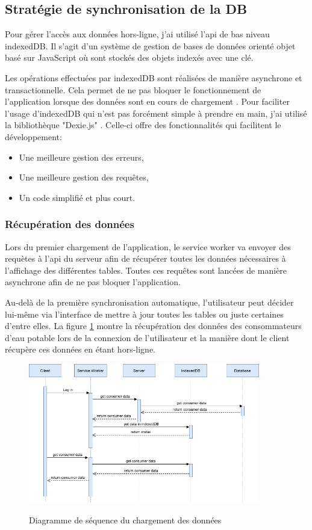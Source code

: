 \documentclass{EPL-master-thesis-covers-FR}
\begin{document}
					
			\subsection*{Stratégie de synchronisation de la DB}
				Pour gérer l'accès aux données hors-ligne, j'ai utilisé l'\gls{api} de bas niveau indexedDB. Il s'agit d'un système de gestion de bases de données orienté objet basé sur JavaScript où sont stockés des objets indexés avec une clé. 
				
				Les opérations effectuées par indexedDB sont réalisées de manière asynchrone et transactionnelle. Cela permet de ne pas bloquer le fonctionnement de l'application lorsque des données sont en cours de chargement \cite{ref:indexedDB}. Pour faciliter l'usage d'indexedDB qui n'est pas forcément simple à prendre en main, j'ai utilisé la bibliothèque "Dexie.js" \cite{ref:dexie}. Celle-ci offre des fonctionnalités qui facilitent le développement: 
				\begin{itemize}
					\item Une meilleure gestion des erreurs,
					\item Une meilleure gestion des requêtes,
					\item Un code simplifié et plus court.
				\end{itemize}					
				
				
				\subsubsection*{Récupération des données}
					Lors du premier chargement de l'application, le service worker va envoyer des requètes à l'\gls{api} du serveur afin de récupérer toutes les données nécessaires à l'affichage des différentes tables. Toutes ces requêtes sont lancées de manière asynchrone afin de ne pas bloquer l'application. 
					
					Au-delà de la première synchronisation automatique, l'utilisateur peut décider lui-même via l'interface de mettre à jour toutes les tables ou juste certaines d'entre elles. La figure \ref{fig:recuparation} montre la récupération des données des consommateurs d'eau potable lors de la connexion de l'utilisateur et la manière dont le client récupère ces données en étant hors-ligne.
					
					\begin{figure}[H]
						\centering
						\includegraphics[width=0.9\textwidth]{images/flow}
						\label{fig:recuparation}
						\caption{Diagramme de séquence du chargement des données}
					\end{figure}
				
\end{document}
